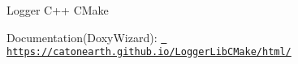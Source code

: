 Logger C++ CMake 

Documentation(\+Doxy\+Wizard)\+: \href{https://catonearth.github.io/LoggerLibCMake/html/}{\texttt{ https\+://catonearth.\+github.\+io/\+Logger\+Lib\+CMake/html/}}
